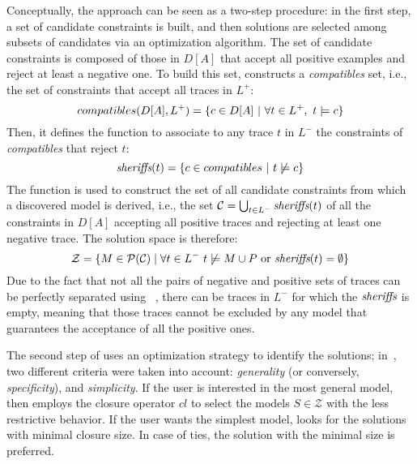 Conceptually, the \nd approach can be seen as a two-step procedure: in the first step, a set of candidate constraints is built, and then solutions are selected among subsets of candidates via an optimization algorithm.
%
The set of candidate constraints is composed of %
those in $D[A]$ that accept all positive examples and reject at least a negative one. To build this set, \nd constructs a \emph{compatibles} set, i.e., the set of constraints that accept all traces in $L^+$: 
\begin{equation}
{compatibles(D[A], L^+)} = \{c\in D[A]~|~\forall t\in L^+,~ t\models c \} \\
\end{equation}
%
Then, it defines the \textit{\sheriff} function to associate to any trace $t$ in $L^-$ the constraints of \textit{compatibles} that reject %
$t$:
\begin{equation}
{\textit{sheriffs}}(t) = \{c\in {compatibles}~|~t\not\models c\} \\
\label{eq:sheriffs}
\end{equation}
%
The \textit{\sheriff} function is used to construct the set of all candidate constraints from which a discovered model is derived, i.e., the set $\mathcal{C} = \bigcup_{t\in L^-} \textit{sheriffs}(t)$ of all the constraints in $D[A]$ accepting all positive traces and rejecting at least one negative trace. The solution space is therefore:
\begin{equation}
  \mathcal{Z}=\{M\in\mathcal{P}(\mathcal{C})\mid \forall t\in L^-~t\not\models M\cup P \text{ or } {\textit{sheriffs}}(t) = \emptyset \}
\end{equation}
Due to the fact that not all the pairs of negative and positive sets of traces can be perfectly separated using \declare~\cite{DBLP:conf/bpm/SlaatsDB21}, there can be traces in $L^-$ for which the ${\textit{sheriffs}}$ is empty, meaning that those traces cannot be excluded by any model that guarantees the acceptance of all the positive ones.

The second step of \nd uses an optimization strategy to identify the solutions; in~\cite{deviant-tkde}, two different criteria were taken into account: \emph{generality} (or conversely, \emph{specificity}), and \emph{simplicity}.
If the user is interested in the most general model, then \nd employs the closure operator $cl$ to select the models $S \in \mathcal{Z}$ with the less restrictive behavior.
If the user wants the simplest model, \nd looks for the solutions with minimal closure size. In case of ties, the solution with the minimal size is preferred.



